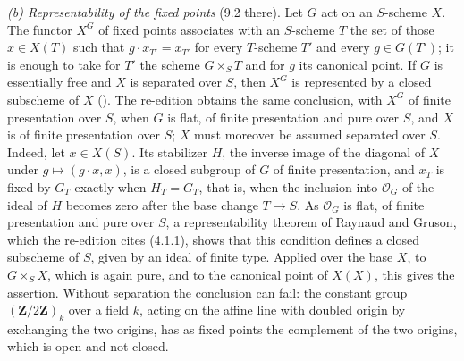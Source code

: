 \emph{(b) Representability of the fixed points} (9.2 there). Let \(G\) act
on an \(S\)-scheme \(X\). The functor \(X^G\) of fixed points associates
with an \(S\)-scheme \(T\) the set of those \(x\in X(T)\) such that
\(g\cdot x_{T'}=x_{T'}\) for every \(T\)-scheme \(T'\) and every
\(g\in G(T')\); it is enough to take for \(T'\) the scheme \(G\times_ST\) and
for \(g\) its canonical point. If \(G\) is essentially free and \(X\) is
separated over \(S\), then \(X^G\) is represented by a closed subscheme of
\(X\) (). The
re-edition obtains the same conclusion, with \(X^G\) of finite presentation
over \(S\), when \(G\) is flat, of finite presentation and pure over \(S\),
and \(X\) is of finite presentation over \(S\); \(X\) must moreover be
assumed separated over \(S\). Indeed, let \(x\in X(S)\). Its stabilizer
\(H\), the inverse image of the diagonal of \(X\) under
\(g\mapsto(g\cdot x,x)\), is a closed subgroup of \(G\) of finite
presentation, and \(x_T\) is fixed by \(G_T\) exactly when \(H_T=G_T\), that
is, when the inclusion into \(\mathcal O_G\) of the ideal of \(H\) becomes
zero after the base change \(T\to S\). As \(\mathcal O_G\) is flat, of
finite presentation and pure over \(S\), a representability theorem of
Raynaud and Gruson, which the re-edition cites (4.1.1), shows that this
condition defines a closed subscheme of \(S\), given by an ideal of finite
type. Applied over the base \(X\), to \(G\times_SX\), which is again pure,
and to the canonical point of \(X(X)\), this gives the assertion. Without
separation the conclusion can fail: the constant group
\((\mathbf Z/2\mathbf Z)_k\) over a field \(k\), acting on the affine line
with doubled origin by exchanging the two origins, has as fixed points the
complement of the two origins, which is open and not closed.

